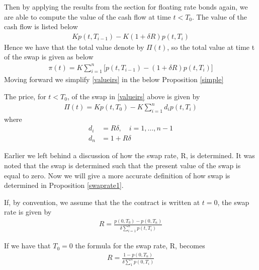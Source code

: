 Then by applying the results from the section for floating rate bonds again, we are able to compute the value of the 
cash flow at time $t<T_0$. The value of the cash flow is listed below
\begin{align*}
    K p(t,T_{i-1})-K(1+\delta R)p(t,T_i)
\end{align*}
Hence we have that the total value denote by $\Pi(t)$, so the total value at time t of the swap is given as below
\begin{align}
    \pi (t) = K \sum_{i=1}^{n} \Big[p(t,T_{i-1})-(1+ \delta R)p(t,T_i)\Big]
    \label{valueirs}
\end{align}
Moving forward we simplify \autoref{valueirs} in the below Proposition \ref{simple} \cite{Bjork}
\begin{proposition}
    The price, for $t<T_0$, of the swap in \autoref{valueirs} above
    is given by 
    \begin{align*}
        \Pi(t) = K p(t,T_0)-K \sum_{i=1}^{n}d_i p(t,T_i)
    \end{align*}
    where
    \begin{align*}
        d_i &= R \delta, \quad i=1,...,n-1 \\
        d_n &= 1+ R \delta
    \end{align*}
    \label{simple}
\end{proposition}
\noindent 
Earlier we left behind a discussion of how the swap rate, R,  is determined. 
It was noted that the swap is determined such that the present value of
the swap is equal to zero. Now we will give a more accurate definition of how swap is determined in Proposition \ref{swaprate1}.
\begin{proposition}
    If, by convention, we assume that the the contract is written at $t=0$, 
    the swap rate is given by \cite{Bjork}
    \begin{align*}
        R = \frac{p(0,T_0)-p(0,T_n)}{\delta \sum_{i=1}^{n}p(t,T_i)}
    \end{align*} 
    \label{swaprate1}
\end{proposition}
\noindent 
If we have that $T_0=0$ the formula for the swap rate, R, becomes
\begin{align*}
    R= \frac{1-p(0,T_n)}{\delta \sum_{1}^{n}p(0,T_i)}
\end{align*}
